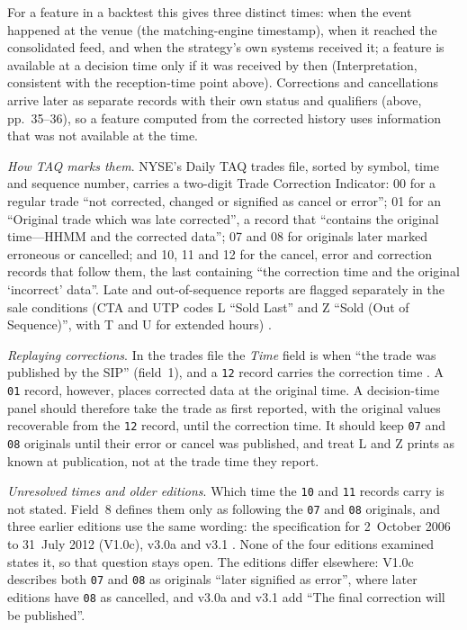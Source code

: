 \begin{qfdata}
For a feature in a backtest this gives three distinct times: when the event happened at the venue (the matching-engine timestamp), when it reached the consolidated feed, and when the strategy's own systems received it; a feature is available at a decision time only if it was received by then (Interpretation, consistent with the reception-time point above). Corrections and cancellations arrive later as separate records with their own status and qualifiers (above, pp.~35--36), so a feature computed from the corrected history uses information that was not available at the time.

\emph{How TAQ marks them}. NYSE's Daily TAQ trades file, sorted by symbol, time and sequence number, carries a two-digit Trade Correction Indicator: 00 for a regular trade ``not corrected, changed or signified as cancel or error''; 01 for an ``Original trade which was late corrected'', a record that ``contains the original time---HHMM and the corrected data''; 07 and 08 for originals later marked erroneous or cancelled; and 10, 11 and 12 for the cancel, error and correction records that follow them, the last containing ``the correction time and the original `incorrect' data''. Late and out-of-sequence reports are flagged separately in the sale conditions (CTA and UTP codes L ``Sold Last'' and Z ``Sold (Out of Sequence)'', with T and U for extended hours) \citep[v4.0 of 2 November 2022, sec.~3, pp.~17--19]{nyse-daily-taq-spec}.

\emph{Replaying corrections}. In the trades file the \emph{Time} field is when ``the trade was published by the SIP'' (field~1), and a \texttt{12} record carries the correction time \citep[sec.~3, PDF pp.~17--19]{nyse-daily-taq-spec}. A \texttt{01} record, however, places corrected data at the original time. A decision-time panel should therefore take the trade as first reported, with the original values recoverable from the \texttt{12} record, until the correction time. It should keep \texttt{07} and \texttt{08} originals until their error or cancel was published, and treat L and Z prints as known at publication, not at the trade time they report.

\emph{Unresolved times and older editions}. Which time the \texttt{10} and \texttt{11} records carry is not stated. Field~8 defines them only as following the \texttt{07} and \texttt{08} originals, and three earlier editions use the same wording: the specification for 2~October 2006 to 31~July 2012 (V1.0c), v3.0a and v3.1 \citep[V1.0c, PDF p.~19; v3.0a, PDF p.~19; v3.1, PDF p.~17]{nyse-daily-taq-spec-older}. None of the four editions examined states it, so that question stays open. The editions differ elsewhere: V1.0c describes both \texttt{07} and \texttt{08} as originals ``later signified as error'', where later editions have \texttt{08} as cancelled, and v3.0a and v3.1 add ``The final correction will be published''.


\end{qfdata}
